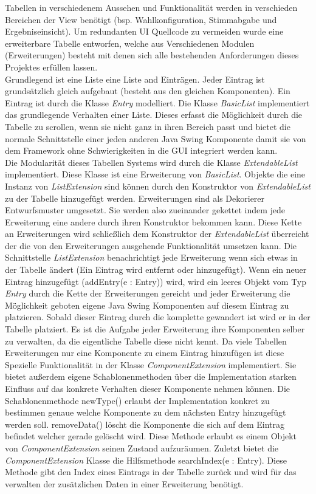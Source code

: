 \documentclass[parskip=full]{scrartcl}
\begin{document}
		Tabellen in verschiedenem Aussehen und Funktionalität werden in verschieden Bereichen der View benötigt (bsp. Wahlkonfiguration, Stimmabgabe und Ergebniseinsicht). Um redundanten UI Quellcode zu vermeiden wurde eine erweiterbare Tabelle entworfen, welche aus Verschiedenen Modulen (Erweiterungen) besteht mit denen sich alle bestehenden Anforderungen dieses Projektes erfüllen lassen.
		\\
		Grundlegend ist eine Liste eine Liste and Einträgen. Jeder Eintrag ist grundsätzlich gleich aufgebaut (besteht aus den gleichen Komponenten). Ein Eintrag ist durch die Klasse \textit{Entry} modelliert. Die Klasse \textit{BasicList} implementiert das grundlegende Verhalten einer Liste. Dieses erfasst die Möglichkeit durch die Tabelle zu scrollen, wenn sie nicht ganz in ihren Bereich passt und bietet die normale Schnittstelle einer jeden anderen Java Swing Komponente damit sie von dem Framework ohne Schwierigkeiten in die GUI integriert werden kann.
		\\
		Die Modularität dieses Tabellen Systems wird durch die Klasse \textit{ExtendableList} implementiert. Diese Klasse ist eine Erweiterung von \textit{BasicList}. Objekte die eine Instanz von \textit{ListExtension} sind können durch den Konstruktor von \textit{ExtendableList} zu der Tabelle hinzugefügt werden. Erweiterungen sind als Dekorierer Entwurfsmuster umgesetzt. Sie werden also zueinander gekettet indem jede Erweiterung eine andere durch ihren Konstruktor bekommen kann. Diese Kette an Erweiterungen wird schließlich dem Konstruktor der \textit{ExtendableList} überreicht der die von den Erweiterungen ausgehende Funktionalität umsetzen kann. Die Schnittstelle \textit{ListExtension} benachrichtigt jede Erweiterung wenn sich etwas in der Tabelle ändert (Ein Eintrag wird entfernt oder hinzugefügt). Wenn ein neuer Eintrag hinzugefügt (addEntry(e : Entry)) wird, wird ein leeres Objekt vom Typ \textit{Entry} durch die Kette der Erweiterungen gereicht und jeder Erweiterung die Möglichkeit geboten eigene Java Swing Komponenten auf diesem Eintrag zu platzieren. Sobald dieser Eintrag durch die komplette gewandert ist wird er in der Tabelle platziert. Es ist die Aufgabe jeder Erweiterung ihre Komponenten selber zu verwalten, da die eigentliche Tabelle diese nicht kennt. Da viele Tabellen Erweiterungen nur eine Komponente zu einem Eintrag hinzufügen ist diese Spezielle Funktionalität in der Klasse \textit{ComponentExtension} implementiert. Sie bietet außerdem eigene Schablonenmethoden über die Implementation starken Einfluss auf das konkrete Verhalten dieser Komponente nehmen können. Die Schablonenmethode newType() erlaubt der Implementation konkret zu bestimmen genaue welche Komponente zu dem nächsten Entry hinzugefügt werden soll. removeData() löscht die Komponente die sich auf dem Eintrag befindet welcher gerade gelöscht wird. Diese Methode erlaubt es einem Objekt von \textit{ComponentExtension} seinen Zustand aufzuräumen. Zuletzt bietet die \textit{ComponentExtension} Klasse die Hilfsmethode searchIndex(e : Entry). Diese Methode gibt den Index eines Eintrags in der Tabelle zurück und wird für das verwalten der zusätzlichen Daten in einer Erweiterung benötigt.
\end{document}
